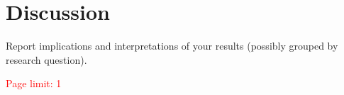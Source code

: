 \section{Discussion}
Report implications and interpretations of your results (possibly grouped by research question).

\textcolor{red}{Page limit: 1}
